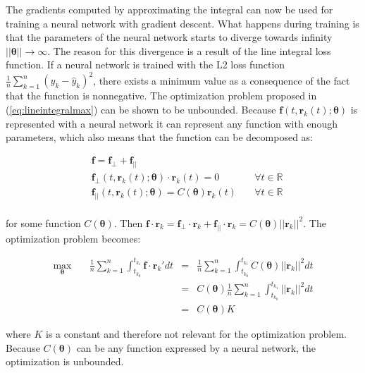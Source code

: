 \documentclass[12pt,a4paper]{book}
\begin{document}
The gradients computed by approximating the integral can now be used for training a neural network with gradient descent. What happens during training is that the parameters of the neural network starts to diverge towards infinity $|| \bm{\theta} || \rightarrow \infty$. The reason for this divergence is a result of the line integral loss function. If a neural network is trained with the L2 loss function $\frac{1}{n} \sum_{k=1}^{n} (y_k - \hat{y}_k)^2$, there exists a minimum value as a consequence of the fact that the function is nonnegative. The optimization problem proposed in (\ref{eq:lineintegralmax}) can be shown to be unbounded. Because $\bm{f}(t, \bm{r}_k(t); \bm{\theta})$ is represented with a neural network it can represent any function with enough parameters, which also means that the function can be decomposed as:

\begin{equation}
    \begin{aligned}
        & \bm{f} = \bm{f}_{\perp} + \bm{f}_{||} & \quad \\
        & \bm{f}_{\perp}(t, \bm{r}_k(t); \bm{\theta}) \cdot \bm{r}_k(t) = 0 & \quad \forall t \in \mathbb{R} \\
        & \bm{f}_{||}(t, \bm{r}_k(t); \bm{\theta}) = C(\bm{\theta}) \bm{r}_k(t) & \quad \forall t \in \mathbb{R} \\
    \end{aligned}
\end{equation}

\noindent for some function $C(\bm{\theta})$. Then $\bm{f} \cdot \bm{r}_k = \bm{f}_{\perp} \cdot \bm{r}_k + \bm{f}_{||} \cdot \bm{r}_k = C(\bm{\theta}) || \bm{r}_k ||^2$. The optimization problem becomes:

\begin{equation}
    \begin{aligned}
        \max_{\bm{\theta}} \quad & \frac{1}{n} \sum_{k=1}^{n} \int_{t_{k_0}}^{t_{k_1}} \bm{f} \cdot \bm{r}_k' dt & = & \frac{1}{n} \sum_{k=1}^{n} \int_{t_{k_0}}^{t_{k_1}} C(\bm{\theta}) || \bm{r}_k ||^2 dt \\
        & & = & C(\bm{\theta}) \frac{1}{n} \sum_{k=1}^{n} \int_{t_{k_0}}^{t_{k_1}} || \bm{r}_k ||^2 dt \\
        & & = & C(\bm{\theta}) K
    \end{aligned}
\end{equation}

\noindent where $K$ is a constant and therefore not relevant for the optimization problem. Because $C(\bm{\theta})$ can be any function expressed by a neural network, the optimization is unbounded.
\end{document}
